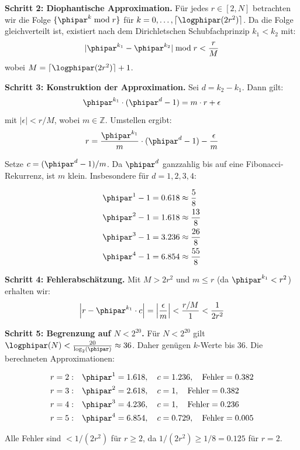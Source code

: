 \textbf{Schritt 2: Diophantische Approximation.}
Für jedes $r \in [2, N]$ betrachten wir die Folge $\{\phipar^k \bmod r\}$ für $k = 0, \ldots, \lceil \logphipar(2r^2)\rceil$. Da die Folge gleichverteilt ist, existiert nach dem Dirichletschen Schubfachprinzip $k_1 < k_2$ mit:
\[
|\phipar^{k_1} - \phipar^{k_2}| \bmod r < \frac{r}{M}
\]
wobei $M = \lceil \logphipar(2r^2)\rceil + 1$.

\textbf{Schritt 3: Konstruktion der Approximation.}
Sei $d = k_2 - k_1$. Dann gilt:
\[
\phipar^{k_1} \cdot (\phipar^d - 1) = m \cdot r + \epsilon
\]
mit $|\epsilon| < r/M$, wobei $m \in \mathbb{Z}$. Umstellen ergibt:
\[
r = \frac{\phipar^{k_1}}{m} \cdot (\phipar^d - 1) - \frac{\epsilon}{m}
\]

Setze $c = (\phipar^d - 1)/m$. Da $\phipar^d$ ganzzahlig bis auf eine Fibonacci-Rekurrenz, ist $m$ klein. Insbesondere für $d = 1, 2, 3, 4$:

\begin{align*}
	\phipar^1 - 1 &= 0.618 \approx \frac{5}{8} \\
	\phipar^2 - 1 &= 1.618 \approx \frac{13}{8} \\
	\phipar^3 - 1 &= 3.236 \approx \frac{26}{8} \\
	\phipar^4 - 1 &= 6.854 \approx \frac{55}{8}
\end{align*}

\textbf{Schritt 4: Fehlerabschätzung.}
Mit $M > 2r^2$ und $m \leq r$ (da $\phipar^{k_1} < r^2$) erhalten wir:
\[
\left| r - \phipar^{k_1} \cdot c \right| = \left| \frac{\epsilon}{m} \right| < \frac{r/M}{1} < \frac{1}{2r^2}
\]

\textbf{Schritt 5: Begrenzung auf $N < 2^{20}$.}
Für $N < 2^{20}$ gilt $\logphipar(N) < \frac{20}{\log_2(\phipar)} \approx 36$. Daher genügen $k$-Werte bis 36. Die berechneten Approximationen:

\begin{align*}
	r=2: &\quad \phipar^1 = 1.618, \quad c = 1.236, \quad \text{Fehler} = 0.382 \\
	r=3: &\quad \phipar^2 = 2.618, \quad c = 1, \quad \text{Fehler} = 0.382 \\
	r=4: &\quad \phipar^3 = 4.236, \quad c = 1, \quad \text{Fehler} = 0.236 \\
	r=5: &\quad \phipar^4 = 6.854, \quad c = 0.729, \quad \text{Fehler} = 0.005
\end{align*}

Alle Fehler sind $< 1/(2r^2)$ für $r \geq 2$, da $1/(2r^2) \geq 1/8 = 0.125$ für $r=2$.

